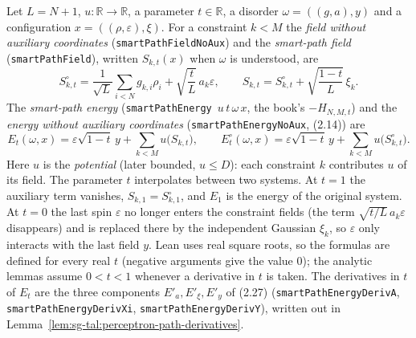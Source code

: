 \begin{definition}\label{def:sg-tal:perceptron-smartpath-energy}
  \leanok
Let $L=N+1$, $u:\mathbb R\to\mathbb R$, a parameter $t\in\mathbb R$, a disorder $\omega=((g,a),y)$ and a configuration
$x=((\rho,\varepsilon),\xi)$. For a constraint $k<M$ the \emph{field without auxiliary coordinates}
(\texttt{smartPathFieldNoAux}) and the \emph{smart-path field} (\texttt{smartPathField}), written $S_{k,t}(x)$ when $\omega$ is
understood, are
\[
 S^\circ_{k,t}=\frac1{\sqrt L}\sum_{i<N}g_{k,i}\rho_i+\sqrt{\frac tL}\,a_k\varepsilon,
 \qquad
 S_{k,t}=S^\circ_{k,t}+\sqrt{\frac{1-t}L}\,\xi_k .
\]
The \emph{smart-path energy} (\texttt{smartPathEnergy}~$u\,t\,\omega\,x$, the book's $-H_{N,M,t}$) and the \emph{energy without
auxiliary coordinates} (\texttt{smartPathEnergyNoAux}, (2.14)) are
\[
 E_t(\omega,x)=\varepsilon\sqrt{1-t}\,y+\sum_{k<M}u\bigl(S_{k,t}\bigr),
 \qquad
 E^\circ_t(\omega,x)=\varepsilon\sqrt{1-t}\,y+\sum_{k<M}u\bigl(S^\circ_{k,t}\bigr).
\]
Here $u$ is the \emph{potential} (later bounded, $u\le D$): each constraint $k$ contributes $u$ of its field. The parameter $t$
interpolates between two systems. At $t=1$ the auxiliary term vanishes, $S_{k,1}=S^\circ_{k,1}$, and $E_1$ is the energy of the
original system. At $t=0$ the last spin $\varepsilon$ no longer enters the constraint fields (the term $\sqrt{t/L}\,a_k\varepsilon$
disappears) and is replaced there by the independent Gaussian $\xi_k$, so $\varepsilon$ only interacts with the last field $y$.
Lean uses real square roots, so the formulas are defined for every real $t$ (negative arguments give the value $0$); the
analytic lemmas assume $0<t<1$ whenever a derivative in $t$ is taken. The derivatives in $t$ of $E_t$ are the three components
$E'_a,E'_\xi,E'_y$ of (2.27) (\texttt{smartPathEnergyDerivA}, \texttt{smartPathEnergyDerivXi}, \texttt{smartPathEnergyDerivY}),
written out in Lemma~\ref{lem:sg-tal:perceptron-path-derivatives}.
\end{definition}

